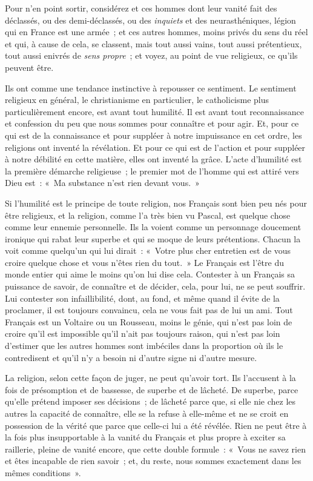 \documentclass[french,twoside]{book} %
\begin{document}
\noindent Pour n’en point sortir, considérez et ces hommes dont leur vanité fait des déclassés, ou des demi-déclassés, ou des {\itshape inquiets} et des neurasthéniques, légion qui en France est une armée ; et ces autres hommes, moins privés du sens du réel et qui, à cause de cela, se classent, mais tout aussi vains, tout aussi prétentieux, tout aussi enivrés de {\itshape sens propre} ; et voyez, au point de vue religieux, ce qu’ils peuvent être.\par
Ils ont comme une tendance instinctive à repousser ce sentiment. Le sentiment religieux en général, le christianisme en particulier, le catholicisme plus particulièrement encore, est avant tout humilité. Il est avant tout reconnaissance et confession du peu que nous sommes pour connaître et pour agir. Et, pour ce qui est de la connaissance et pour suppléer à notre impuissance en cet ordre, les religions ont inventé la révélation. Et pour ce qui est de l’action et pour suppléer à notre débilité en cette matière, elles ont inventé la grâce. L’acte d’humilité est la première démarche religieuse ; le premier mot de l’homme qui est attiré  vers Dieu est : « Ma substance n’est rien devant vous. »\par
Si l’humilité est le principe de toute religion, nos Français sont bien peu nés pour être religieux, et la religion, comme l’a très bien vu Pascal, est quelque chose comme leur ennemie personnelle. Ils la voient comme un personnage doucement ironique qui rabat leur superbe et qui se moque de leurs prétentions. Chacun la voit comme quelqu’un qui lui dirait : « Votre plus cher entretien est de vous croire quelque chose et vous n’êtes rien du tout. » Le Français est l’être du monde entier qui aime le moins qu’on lui dise cela. Contester à un Français sa puissance de savoir, de connaître et de décider, cela, pour lui, ne se peut souffrir. Lui contester son infaillibilité, dont, au fond, et même quand il évite de la proclamer, il est toujours convaincu, cela ne vous fait pas de lui un ami. Tout Français est un Voltaire ou un Rousseau, moins le génie, qui n’est pas loin de croire qu’il est impossible qu’il n’ait pas toujours raison, qui n’est pas loin d’estimer que les autres hommes sont imbéciles dans la proportion où ils le contredisent et qu’il n’y a besoin ni d’autre signe ni d’autre mesure.\par
La religion, selon cette façon de juger, ne peut qu’avoir tort. Ils l’accusent à la fois de présomption et de bassesse, de superbe et de lâcheté. De superbe, parce qu’elle prétend imposer ses décisions ; de  lâcheté parce que, si elle nie chez les autres la capacité de connaître, elle se la refuse à elle-même et ne se croit en possession de la vérité que parce que celle-ci lui a été révélée. Rien ne peut être à la fois plus insupportable à la vanité du Français et plus propre à exciter sa raillerie, pleine de vanité encore, que cette double formule : « Vous ne savez rien et êtes incapable de rien savoir ; et, du reste, nous sommes exactement dans les mêmes conditions ».\par
\end{document}
